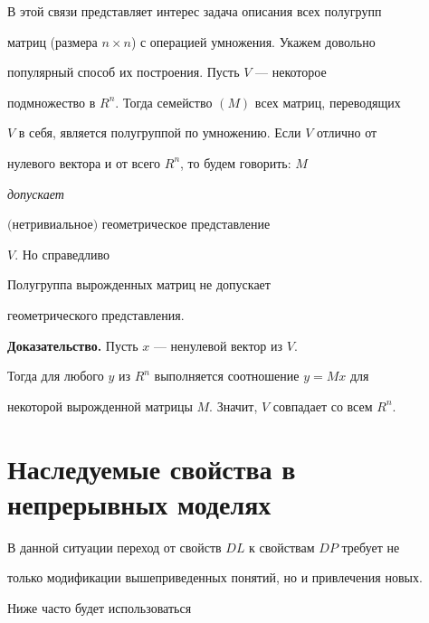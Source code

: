  


В этой связи представляет интерес задача описания всех полугрупп 


матриц (размера $n\times n$) с операцией умножения. Укажем довольно 


популярный способ их построения. Пусть $V$ --- некоторое 


подмножество в $R^n$. Тогда семейство $(M)$ всех матриц, переводящих 


$V$ в себя, является полугруппой по умножению. Если $V$ отлично от 


нулевого вектора и от всего $R^n$, то будем говорить: $M$ {\it допускает 


$($нетривиальное\/$)$ геометрическое представление} $V$. Но справедливо 


 


\begin{prop} 


Полугруппа вырожденных матриц не допускает 


геометрического представления. 


\end{prop} 


 


{\bf Доказательство.} Пусть $x$ --- ненулевой вектор из $V$. 


Тогда для любого $y$ из $R^n$ выполняется соотношение $y=M x$ для 


некоторой вырожденной матрицы $M$. Значит, $V$ совпадает со всем $R^n$. 


 


\section{Наследуемые свойства в непрерывных моделях} 


 


В данной ситуации переход от свойств $D L$ к свойствам $D P$ требует не 


только модификации вышеприведенных понятий, но и привлечения новых. 


 


Ниже часто будет использоваться 


\medskip 


 


